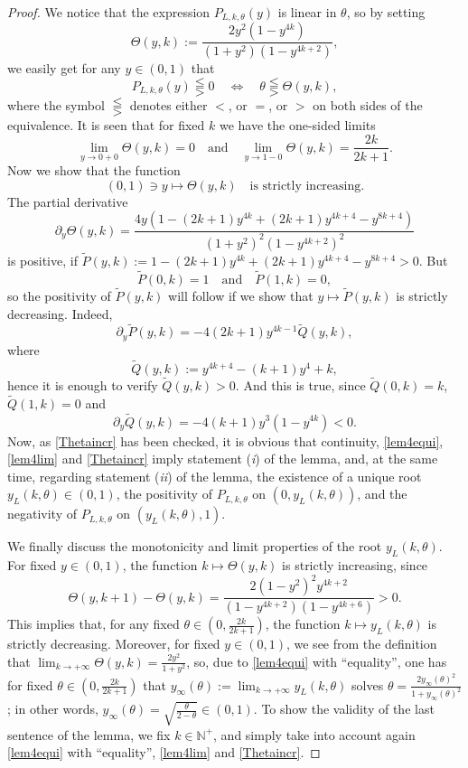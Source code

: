 \documentclass[a4paper]{article}
\newcommand{\te}{\theta}
\newcommand{\yl}{y_L(k,\theta)}
\newcommand{\nplus}{\mathbb{N}^+}
\newcommand{\Pol}{P_{L,k,\te}(y)}
\begin{document}
\begin{proof}
We notice that the expression $\Pol$ is linear in $\te$, so by setting 
\[
\Theta(y,k):=\frac{2 y^2 \left(1-y^{4 k}\right)}{\left(1+y^2\right) \left(1-y^{4 k+2}\right)},
\]
we easily get for any $y\in(0,1)$ that
\begin{equation}\label{lem4equi}
\Pol \lesseqqgtr 0\quad \Longleftrightarrow \quad \te\lesseqqgtr\Theta(y,k),
\end{equation}
where the symbol $\lesseqqgtr$ denotes either $<$, or $=$, or $>$ on both sides of the equivalence. It is
seen that for fixed $k$ we have the one-sided limits
\begin{equation}\label{lem4lim}
\lim_{y\to 0+0}\Theta(y,k)=0\quad\text{and}\quad\lim_{y\to 1-0}\Theta(y,k)=\frac{2k}{2k+1}.
\end{equation}
Now we show that the function
\begin{equation}\label{Thetaincr}
(0,1)\ni y\mapsto \Theta(y,k)\quad\text{is strictly increasing.}
\end{equation}
The partial derivative
\[
\partial_y\Theta(y,k)=\frac{4 y \left(1-(2 k+1) y^{4 k}+(2 k+1) y^{4 k+4}-y^{8 k+4}\right)}{\left(1+y^2\right)^2 \left(1-y^{4 k+2}\right)^2}
\]
is positive, if $\widetilde{P}(y,k):=1-(2 k+1) y^{4 k}+(2 k+1) y^{4 k+4}-y^{8 k+4}>0$. But 
\[
\widetilde{P}(0,k)=1\quad\text{and}\quad\widetilde{P}(1,k)=0,
\]
so the positivity of $\widetilde{P}(y,k)$ will follow if we show that $y\mapsto\widetilde{P}(y,k)$ is strictly decreasing. Indeed,
\[
\partial_y\widetilde{P}(y,k)=-4 (2 k+1) y^{4 k-1} \widetilde{Q}(y,k),
\]
where
\[
\widetilde{Q}(y,k):=y^{4 k+4}-(k+1) y^4+k,
\]
hence it is enough to verify $\widetilde{Q}(y,k)>0$. And this is true, since $\widetilde{Q}(0,k)=k$, $\widetilde{Q}(1,k)=0$ and
\[
\partial_y \widetilde{Q}(y,k)=-4 (k+1) y^3 \left(1-y^{4 k}\right)<0.
\]
Now, as \eqref{Thetaincr} has been checked, it is obvious that continuity, \eqref{lem4equi}, \eqref{lem4lim} and \eqref{Thetaincr} imply statement (\textit{i}) of the lemma, and, at the same time, regarding statement (\textit{ii}) of the lemma, the existence of a unique root $\yl\in(0,1)$, the positivity of $P_{L,k,\te}$ on $(0,\yl)$, and the negativity of $P_{L,k,\te}$ on $(\yl,1)$.

We finally discuss the monotonicity and limit properties of the root $\yl$. For fixed $y\in(0,1)$, the function $k\mapsto\Theta(y,k)$ is strictly increasing, since
\[
\Theta(y,k+1)-\Theta(y,k)=\frac{2 \left(1-y^2\right)^2 y^{4 k+2}}{\left(1-y^{4 k+2}\right) \left(1-y^{4
   k+6}\right)}>0.
\]
This implies that, for any fixed $\te\in\left(0,\frac{2k}{2k+1}\right)$, the function $k\mapsto\yl$ is strictly decreasing. Moreover, for fixed $y\in(0,1)$, we see from the definition that $\lim_{k\to+\infty} \Theta(y,k)=\frac{2 y^2}{1+y^2}$,
so, due to \eqref{lem4equi} with ``equality'', one has for fixed $\te\in\left(0,\frac{2k}{2k+1}\right)$ that $y_{\infty}(\te):=\lim_{k\to+\infty} \yl$ solves $\te=\frac{2 y_{\infty}(\te)^2}{1+y_{\infty}(\te)^2}$; in other words, $y_{\infty}(\te)=\sqrt{\frac{\te}{2-\te}}\in(0,1)$. To show the validity of the last sentence of the lemma, we fix $k\in\nplus$, and simply take into account again \eqref{lem4equi} with ``equality'', \eqref{lem4lim} and \eqref{Thetaincr}.
\end{proof}
\end{document}
